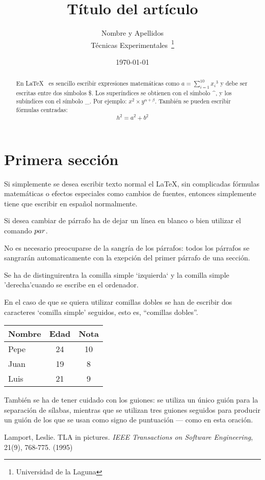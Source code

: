\documentclass[a4paper,12pt]{article}
\begin{document}
\title{Título del artículo}
\author{Nombre y Apellidos \\
        Técnicas Experimentales~\footnote{Universidad de la Laguna}
        }
\date{\today}
\maketitle
\begin{abstract}
  En \LaTeX{}~\cite{Lam:86} es sencillo escribir expresiones
  matemáticas como $a=\sum_{i=1}^{10} {x_i}^{3}$
  y debe ser escritas entre dos símbolos \$.
  Los superíndices se obtienen con el símbolo \^{}, y
  los subíndices con el símbolo \_.
  Por ejemplo: $x^2 \times y^{\alpha + \beta}$.
  También se pueden escribir fórmulas centradas:
  \[h^2=a^2 + b^2 \]
\end{abstract}

\section{Primera sección}
Si simplemente se desea escribir texto normal el LaTeX,
sin complicadas f\'ormulas matem\'aticas o efectos especiales
como cambios de fuentes, entonces simplemente tiene que escribir
en espa\~nol normalmente.\par
Si desea cambiar de párrafo ha de dejar un línea en blanco o bien
utilizar el comando $\\par$.


No es necesario preocuparse de la sangría de los párrafos:
todos los párrafos se sangrarán automaticamente con la exepción
del primer párrafo de una sección.

Se ha de distinguirentra la comilla simple `izquierda`
y la comilla simple 'derecha'cuando se escribe en el ordenador.

En el caso de que se quiera utilizar comillas dobles se han de
escribir dos caracteres `comilla simple' seguidos, esto es,
``comillas dobles''. 

\bigskip
\begin{tabular}{|l|c|c|}
\hline
Nombre & Edad & Nota \\ \hline
Pepe & 24 & 10 \\ \hline
Juan & 19 & 8 \\ \hline
Luis & 21 & 9 \\ \hline
\end{tabular}


También se ha de tener cuidado con los guiones: se utiliza un único
guión para la separación de sílabas, mientras que se utilizan
tres guiones seguidos para producir un guión de los que se usan
como signo de puntuación --- como en esta oración.

\begin{thebibliography}{00}
    Lamport, Leslie.
    TLA in pictures.
    \emph{IEEE Transactions on Software Engineering},
    21(9), 768-775.
    (1995)
\end{thebibliography}
\end{document}
